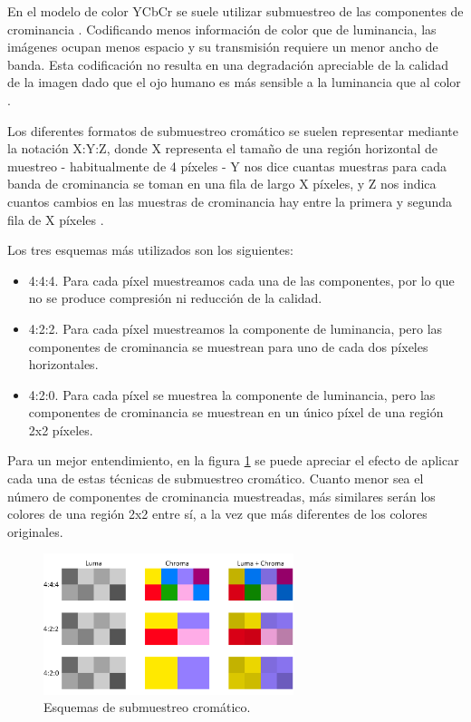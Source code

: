 En el modelo de color YCbCr se suele utilizar submuestreo de las componentes de crominancia \cite{submuestreocroma}. Codificando menos información de color que de luminancia, las imágenes ocupan menos espacio y su transmisión requiere un menor ancho de banda. Esta codificación no resulta en una degradación apreciable de la calidad de la imagen dado que el ojo humano es más sensible a la luminancia que al color \cite{submuestreocroma}.

Los diferentes formatos de submuestreo cromático se suelen representar mediante la notación X:Y:Z, donde X representa el tamaño de una región horizontal de muestreo - habitualmente de 4 píxeles - Y nos dice cuantas muestras para cada banda de crominancia se toman en una fila de largo X píxeles, y Z nos indica cuantos cambios en las muestras de crominancia hay entre la primera y segunda fila de X píxeles \cite{submuestreocroma}.

Los tres esquemas más utilizados son los siguientes:
\begin{itemize}
    \item 4:4:4. Para cada píxel muestreamos cada una de las componentes, por lo que no se produce compresión ni reducción de la calidad.
    \item 4:2:2. Para cada píxel muestreamos la componente de luminancia, pero las componentes de crominancia se muestrean para uno de cada dos píxeles horizontales.
    \item 4:2:0. Para cada píxel se muestrea la componente de luminancia, pero las componentes de crominancia se muestrean en un único píxel de una región 2x2 píxeles. 
\end{itemize}
Para un mejor entendimiento, en la figura \ref{fig:subsamplingycbcr} se puede apreciar el efecto de aplicar cada una de estas técnicas de submuestreo cromático. Cuanto menor sea el número de componentes de crominancia muestreadas, más similares serán los colores de una región 2x2 entre sí, a la vez que más diferentes de los colores originales.

\begin{figure}[h!]
    \centering
    \includegraphics[width=0.65\textwidth,height=0.65\textheight,keepaspectratio]{imagenes/parte_BS/subsamplingycbcr.png}    
    \caption{Esquemas de submuestreo cromático.}
    \label{fig:subsamplingycbcr}
\end{figure}

